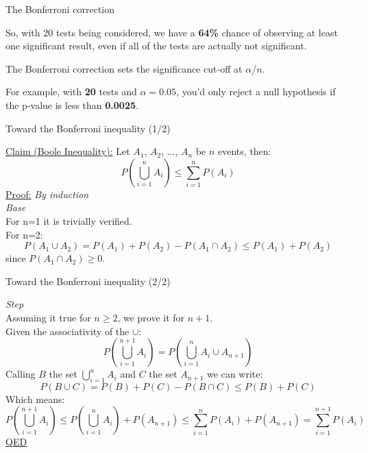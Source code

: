 \documentclass{beamer}
\begin{document}
\begin{frame}
{\centerline{The Bonferroni correction }}
So, with 20 tests being considered, we have a \textbf{64\%} chance of observing at least one significant result, even if all of the tests are actually not significant.
\newline

The Bonferroni correction sets the significance cut-off at $\alpha/n$. 
\newline

For example, with \textbf{20} tests and $\alpha = 0.05$, you’d only reject a null hypothesis if the p-value is less than \textbf{0.0025}.


\end{frame}


\begin{frame}
{\centerline{Toward the Bonferroni inequality (1/2)}}
\underline{Claim (Boole Inequality):} 
Let $A_1$, $A_2$, $\ldots$, $A_n$ be $n$ events, then:
$$ P({\bigcup_{i \mathop = 1}^n A_i}) \le \sum_{i \mathop = 1}^n P({A_i}) $$
\underline{Proof:}
\textit{By induction}\\
\textit{Base}\\
For n=1 it is trivially verified. \\
For n=2:
$$ P(A_1 \cup A_2) =   P(A_1) + P (A_2) - P(A_1 \cap A_2) \le P(A_1) + P (A_2)$$
since $P(A_1 \cap A_2) \ge 0$.


\end{frame}


\begin{frame}
{\centerline{Toward the Bonferroni inequality (2/2) }}
\textit{Step}\\
Assuming it true for $n \ge 2$, we prove it for $n+1$.\\
Given the associativity of the $\cup$:
$$ P({\bigcup_{i \mathop = 1}^{n+1} A_i}) = P({\bigcup_{i \mathop = 1}^{n} A_i \cup A_{n+1}})$$
Calling $B$ the set $\bigcup_{i \mathop = 1}^{n} A_i$ and $C$ the set $ A_{n+1}$ we can write:
$$P(B \cup C) =   P(B) + P (C) - P(B \cap C) \le P(B) + P (C)$$
Which means:
$$ P({\bigcup_{i \mathop = 1}^{n+1} A_i}) \le P({\bigcup_{i \mathop = 1}^{n} A_i}) + P(A_{n+1}) \le \sum_{i \mathop = 1}^n P({A_i}) + P(A_{n+1}) = \sum_{i \mathop = 1}^{n+1} P({A_i})$$
\underline{QED}
\end{frame}
\end{document}
